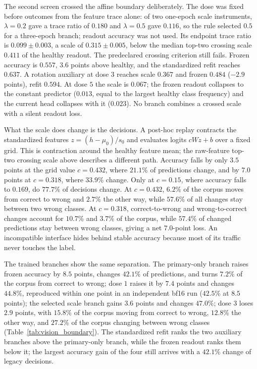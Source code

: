 \documentclass{article}
\begin{document}
The second screen crossed the affine boundary deliberately. The dose was fixed
before outcomes from the feature trace alone: of two one-epoch scale
instruments, $\lambda=0.2$ gave a trace ratio of $0.180$ and $\lambda=0.5$ gave
$0.116$, so the rule selected $0.5$ for a three-epoch branch; readout accuracy
was not used. Its endpoint trace ratio is $0.099\pm0.003$, a scale of
$0.315\pm0.005$, below the median top-two crossing scale $0.411$ of the healthy
readout. The predeclared crossing criterion still fails. Frozen accuracy is
$0.557$, $3.6$ points above healthy, and the standardized refit reaches $0.637$.
A rotation auxiliary at dose $3$ reaches scale $0.367$ and frozen $0.484$
($-2.9$ points), refit $0.594$. At dose $5$ the scale is $0.067$; the frozen
readout collapses to the constant predictor ($0.013$, equal to the largest
healthy class frequency) and the current head collapses with it ($0.023$). No
branch combines a crossed scale with a silent readout loss.



What the scale does change is the decisions. A post-hoc replay contracts the
standardized features $z=(h-\mu_0)/s_0$ and evaluates logits $cWz+b$ over a
fixed grid. This is contraction around the healthy feature mean; the raw-feature
top-two crossing scale above describes a different path. Accuracy falls by
only $3.5$ points at the grid value $c=0.432$, where
$21.1\%$ of predictions change, and by
$7.0$ points at $c=0.318$, where $33.9\%$ change. Only at $c=0.15$, where
accuracy falls to $0.169$, do $77.7\%$ of decisions change. At $c=0.432$,
$6.2\%$ of the corpus moves from correct to wrong and $2.7\%$ the other
way, while $57.6\%$ of all changes stay between two wrong classes. At $c=0.318$,
correct-to-wrong and wrong-to-correct changes account for $10.7\%$ and $3.7\%$
of the corpus, while $57.4\%$ of changed predictions stay between wrong classes,
giving a net $7.0$-point loss. An
incompatible interface hides behind stable accuracy because most of its traffic
never touches the label.

The trained branches show the same separation. The primary-only branch raises
frozen accuracy by $8.5$ points, changes $42.1\%$ of predictions, and turns
$7.2\%$ of the corpus from correct to wrong; dose $1$
raises it by $7.4$ points and changes $44.8\%$, reproduced within one point in
an independent bf16 run ($42.5\%$ at $8.5$ points); the selected scale branch
gains $3.6$ points and changes $47.0\%$; dose $3$ loses $2.9$ points, with
$15.8\%$ of the corpus moving from correct to wrong, $12.8\%$ the other way, and
$27.2\%$ of the corpus changing between wrong classes (Table~\ref{tab:vision_boundary}). The standardized refit ranks the two
auxiliary branches above the primary-only branch, while the frozen readout ranks
them below it; the largest accuracy gain of the four still arrives with a
$42.1\%$ change of legacy decisions.
\end{document}
